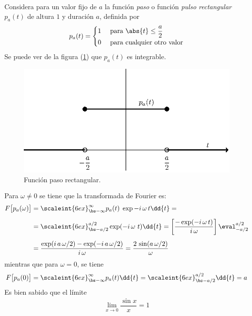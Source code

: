 Considera para un valor fijo de $a$ la función \emph{paso} o función \emph{pulso rectangular} $p_{a}(t)$ de altura $1$ y duración $a$, definida por
\begin{align}
p_{a}(t) = \begin{cases}
1 & \text{ para } \abs{t} \leq \dfrac{a}{2} \\
0 & \text{ para cualquier otro valor} \end{cases}
\label{eq:ecuacion_06_10_Beerends}
\end{align}
Se puede ver de la figura (\ref{fig:figura_funcionpaso}) que $p_{a}(t)$ es integrable.
\begin{figure}[H]
    \centering
    \includegraphics[scale=1]{Imagenes/funcion_paso.eps}
    \caption{Función paso rectangular.}
    \label{fig:figura_funcionpaso}
\end{figure}
Para $\omega \neq 0$ se tiene que la transformada de Fourier es:
\begin{align*}
F \big[p_{a} (\omega)\big] &= \scaleint{6ex}_{\bs -\infty}^{\infty} p_{a}(t) \; \exp{-i \, \omega \, t} \dd{t} = \\[0.5em]
&= \scaleint{6ex}_{\bs -a/2}^{a/2} \exp(-i \, \omega \ t) \dd{t} = \left[ \dfrac{- \exp(- i \, \omega \, t)}{i \, \omega} \right] \eval_{-a/2}^{a/2} \\[0.5em]
&= \dfrac{\exp(i \, a \, \omega/2) - \exp(-i \, a \, \omega/2)}{i \, \omega} = \dfrac{2 \, \sin (a \, \omega/2)}{\omega}
\end{align*}
mientras que para $\omega = 0$, se tiene
\begin{align*}
F \big[p_{a}(0)\big] = \scaleint{6ex}_{\bs -\infty}^{\infty} p_{a}(t) \dd{t} = \scaleint{6ex}_{\bs -a/2}^{a/2} \dd{t} = a
\end{align*}
Es bien sabido que el límite
\begin{align*}
\lim_{x \to 0} \dfrac{\sin x}{x} = 1
\end{align*}
